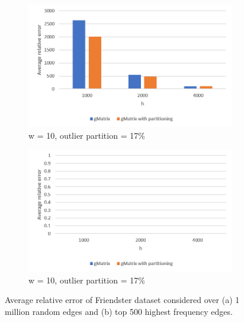 \begin{figure}[!htbp]
\centering
\begin{subfigure}{.5\textwidth}
  \centering
  \includegraphics[width=1\linewidth]{F2}
  \caption{w = 10, outlier partition = 17\%}
  \label{fig:sub1}
\end{subfigure}%
\begin{subfigure}{.5\textwidth}
  \centering
  \includegraphics[width=1\linewidth]{F2T}
  \caption{w = 10, outlier partition = 17\%}
  \label{fig:sub2}
\end{subfigure}
\caption{Average relative error of Friendster dataset considered over (a) 1 million random edges and (b) top 500 highest frequency edges.}
\label{fig:f2}
\end{figure}

